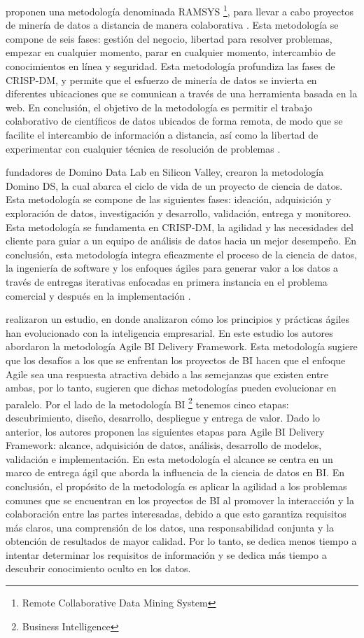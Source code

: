 \cite{Mladenic2012} proponen una metodología denominada RAMSYS \footnote{Remote Collaborative Data Mining System}, para llevar a cabo proyectos de minería de datos a distancia de manera colaborativa . Esta metodología se compone de seis fases: gestión del negocio,  libertad para resolver problemas, empezar en cualquier momento, parar en cualquier momento, intercambio de conocimientos en línea y seguridad. Esta metodología profundiza las fases de CRISP-DM, y permite que el esfuerzo de minería de datos se invierta en diferentes ubicaciones que se comunican a través de una herramienta basada en la web. En conclusión, el objetivo de la metodología es permitir el trabajo colaborativo de científicos de datos ubicados de forma remota, de modo que se facilite el intercambio de información a distancia, así como la libertad de experimentar con cualquier técnica de resolución de problemas \cite{Martinez2021}.

\cite{Elprin2022} fundadores de Domino Data Lab en Silicon Valley, crearon la metodología Domino DS, la cual abarca el ciclo de vida de un proyecto de ciencia de datos. Esta metodología se compone de las siguientes fases: ideación, adquisición y exploración de datos, investigación y desarrollo, validación, entrega y monitoreo. Esta metodología se fundamenta en CRISP-DM, la agilidad y las necesidades del cliente para guiar a un equipo de análisis de datos hacia un mejor desempeño. En conclusión, esta metodología integra eficazmente el proceso de la ciencia de datos, la ingeniería de software y los enfoques ágiles para generar valor a los datos a través de entregas iterativas enfocadas en primera instancia en el problema comercial y después en la implementación \cite{Martinez2021}.

\cite{Larson2016} realizaron un estudio, en donde analizaron cómo los principios y prácticas ágiles han evolucionado con la inteligencia empresarial. En este estudio los autores abordaron la metodología Agile BI Delivery Framework. Esta metodología sugiere que los desafíos a los que se enfrentan los proyectos de BI hacen que el enfoque Agile sea una respuesta atractiva debido a las semejanzas que existen entre ambas, por lo tanto, sugieren que dichas metodologías pueden evolucionar en paralelo. Por el lado de la metodología BI \footnote{Business Intelligence} tenemos cinco etapas: descubrimiento, diseño, desarrollo, despliegue y entrega de valor. Dado lo anterior, los autores proponen las siguientes etapas para Agile BI Delivery Framework: alcance, adquisición de datos, análisis, desarrollo de modelos, validación e implementación. En esta metodología el alcance se centra en un marco de entrega ágil que aborda la influencia de la ciencia de datos en BI. En conclusión, el propósito de la metodología es aplicar la agilidad a los problemas comunes que se encuentran en los proyectos de BI al promover la interacción y la colaboración entre las partes interesadas, debido a que esto garantiza requisitos más claros, una comprensión de los datos, una responsabilidad conjunta y la obtención de resultados de mayor calidad. Por lo tanto, se dedica menos tiempo a intentar determinar los requisitos de información y se dedica más tiempo a descubrir conocimiento oculto en los datos.

